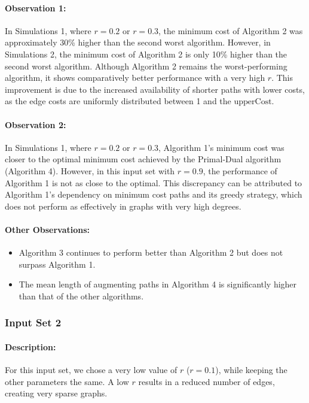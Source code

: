 \documentclass{article}
\begin{document}
\paragraph{Observation 1:}
In Simulations 1, where \( r = 0.2 \) or \( r = 0.3 \), the minimum cost of Algorithm 2 was approximately 30\% higher than the second worst algorithm. However, in Simulations 2, the minimum cost of Algorithm 2 is only 10\% higher than the second worst algorithm. Although Algorithm 2 remains the worst-performing algorithm, it shows comparatively better performance with a very high \( r \). This improvement is due to the increased availability of shorter paths with lower costs, as the edge costs are uniformly distributed between 1 and the \( \text{upperCost} \).

\paragraph{Observation 2:}
In Simulations 1, where \( r = 0.2 \) or \( r = 0.3 \), Algorithm 1's minimum cost was closer to the optimal minimum cost achieved by the Primal-Dual algorithm (Algorithm 4). However, in this input set with \( r = 0.9 \), the performance of Algorithm 1 is not as close to the optimal. This discrepancy can be attributed to Algorithm 1's dependency on minimum cost paths and its greedy strategy, which does not perform as effectively in graphs with very high degrees.

\paragraph{Other Observations:}
\begin{itemize}
    \item Algorithm 3 continues to perform better than Algorithm 2 but does not surpass Algorithm 1.
    \item The mean length of augmenting paths in Algorithm 4 is significantly higher than that of the other algorithms.
\end{itemize}

\subsubsection{Input Set 2}
\paragraph{Description:}
For this input set, we chose a very low value of \( r \) (\( r = 0.1 \)), while keeping the other parameters the same. A low \( r \) results in a reduced number of edges, creating very sparse graphs.
\end{document}
